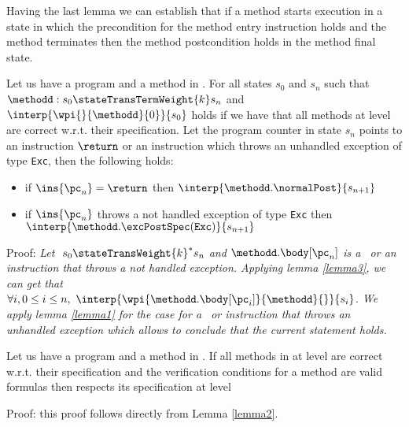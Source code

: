 Having the last lemma we can  establish that if a method starts
execution in a state in which the \fwpi{} precondition  for the method entry instruction 
holds and the method terminates then the method postcondition holds in the method final state.

\begin{lemma}\label{lemma2}
Let us have a program \Program{} and a method \methodd{} in \Program.
For all states $s_0$ and $s_n$ such that   $\methodd : s_0  \stateTransTermWeight{k} s_n $
and $\interp{ \wpi{} {\methodd}{0}}{ s_{0}}$ holds if we have
that all methods at level  are correct w.r.t. their specification.
Let the program counter in state $s_n$ points to an instruction $\return $ or
 an instruction which throws an unhandled exception of type \mbox{\rm\texttt{Exc}}, then  the following holds:
\begin{itemize}
    \item if $\ins{\pc_n} = \return $ then $\interp{ \methodd.\normalPost}{s_{n+1}}$
    \item  if $\ins{\pc_n}$ throws a not handled exception of type \mbox{\rm\texttt{Exc}} then \\ 
             $\interp{ \methodd.\excPostSpec(\mbox{\rm\texttt{Exc}}  )}{s_{n+1}}$
\end{itemize}
\end{lemma}
Proof: 
\textit{Let $ \ s_{0} \stateTransWeight{k}^{*} s_n $ and $\methodd.\body[\pc_n]$ is a \return \ or an instruction that throws a  not handled exception.
 Applying lemma \ref{lemma3}, we can get that $\forall i, 0 \le i \le n , \ \interp{ \wpi{\methodd.\body[\pc_i] } {\methodd}{ } }{ s_{i}}$. 
We apply lemma \ref{lemma1} for the case for a \return \ or instruction that throws an unhandled exception which allows to conclude that the current statement holds.
}
\Qed\\


\begin{lemma}\label{lemmaMethRespSpec}
Let us have a program \Program{} and a method \methodd{} in \Program.
If  all methods in \Program{} at level   are correct w.r.t. their specification 
and the verification conditions for a method  \methodd{} are valid formulas then 
\methodd{}  respects its specification at level  
\end{lemma}
Proof: this proof  follows directly from Lemma \ref{lemma2}.




